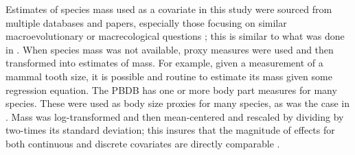 \documentclass[12pt,letterpaper]{article}
\begin{document}


Estimates of species mass used as a covariate in this study were sourced from multiple databases and papers, especially those focusing on similar macroevolutionary or macrecological questions \citep{Tomiya2013,Brook2004a,Freudenthal2013,McKenna2011,Raia2012f,Smith2004}; this is similar to what was done in \citet{Smits2015b}. When species mass was not available, proxy measures were used and then transformed into estimates of mass. For example, given a measurement of a mammal tooth size, it is possible and routine to estimate its mass given some regression equation. The PBDB has one or more body part measures for many species. These were used as body size proxies for many species, as was the case in \citet{Smits2015b}. Mass was log-transformed and then mean-centered and rescaled by dividing by two-times its standard deviation; this insures that the magnitude of effects for both continuous and discrete covariates are directly comparable \citep{Gelman2007,Gelman2008}.
\end{document}
